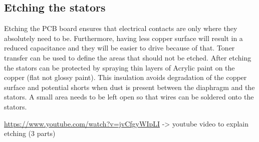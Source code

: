 \documentclass{article}
\begin{document}
\subsection{Etching the stators}
\label{s:driver:etching}
Etching the PCB board ensures that electrical contacts are only where they absolutely need to be. Furthermore, having less copper surface will result in a reduced capacitance and they will be easier to drive because of that. Toner transfer can be used to define the areas that should not be etched. After etching the stators can be protected by spraying thin layers of Acrylic paint on the copper (flat not glossy paint). This insulation avoids degradation of the copper surface and potential shorts when dust is present between the diaphragm and the stators. A small area needs to be left open so that wires can be soldered onto the stators.

\url{https://www.youtube.com/watch?v=jvCfgyWIpLI} -> youtube video to explain etching (3 parts)
\end{document}
